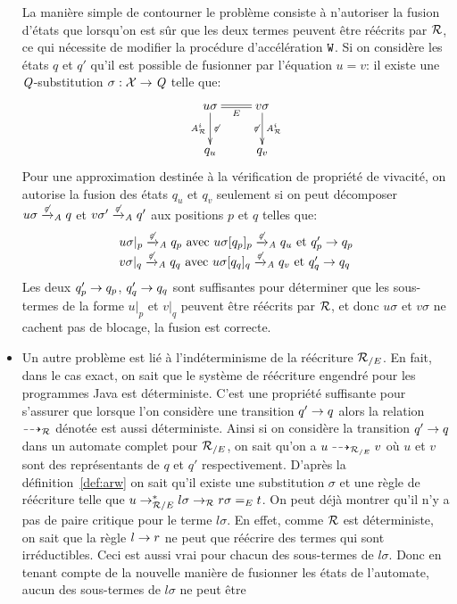 \begin{itemize}
  La manière simple de contourner le problème consiste à n'autoriser la fusion d'états que lorsqu'on est
  sûr que les deux termes peuvent être réécrits par $\mathcal R$, ce qui nécessite de modifier la procédure d'accélération
  $\mathtt{W}$. Si on considère les états $q$ et $q'$ qu'il est possible
  de fusionner par l'équation $u = v$:
  il existe une $\mathit Q$-substitution $\sigma : \mathcal X \rightarrow\mathit Q$ telle que:
   \[\xymatrix{
     u\sigma \ar@{=}[r]_{E}\ar[d]_{\aaex^i}^{\not\varepsilon} & v\sigma \ar[d]_{\not\varepsilon}^{\aaex^i}\\
     q_u & q_v
   } \]
   Pour une approximation destinée à la vérification de propriété de vivacité, on autorise la fusion
   des états $q_u$ et $q_v$ seulement si on peut décomposer
   $u\sigma \xrightarrow{\not\varepsilon}_\mathit A q$ et $v\sigma' \xrightarrow{\not\varepsilon}_\mathit A q'$ aux positions $p$ et $q$ telles que:
   \[\begin{array}{l}
     u\sigma|_p \xrightarrow{\not\varepsilon}_\mathit A q_p \textrm{ avec } u\sigma[q_p]_p \xrightarrow{\not\varepsilon}_\mathit A q_u \textrm{ et } q'_p \rightarrow q_p\\ 
     v\sigma|_q \xrightarrow{\not\varepsilon}_\mathit A q_q \textrm{ avec } u\sigma[q_q]_q \xrightarrow{\not\varepsilon}_\mathit A q_v \textrm{ et } q'_q \rightarrow q_q
   \end{array}\]
   Les deux $q'_p \rightarrow q_p$, $q'_q \rightarrow q_q$ sont suffisantes pour déterminer que les sous-termes de la forme $u|_p$
   et $v|_q$ peuvent être réécrits par $\mathcal R$, et donc $u\sigma$ et $v\sigma$ ne cachent pas de blocage, la fusion
   est correcte.
 \item
   Un autre problème est lié à l'indéterminisme de la réécriture ${\mathcal R_{/E}}$. En fait, dans le cas
   exact, on sait que le système de réécriture engendré pour les programmes Java est déterministe.
   C'est une propriété suffisante pour s'assurer que lorsque l'on considère une transition $q' \rightarrow q$
   alors la relation $\dashrightarrow_{\mathcal R}$ dénotée est aussi déterministe.
   Ainsi si on considère la transition $q' \rightarrow q$ dans un automate complet pour ${\mathcal R_{/E}}$, on sait
   qu'on a $u \dashrightarrow_{\mathcal R_{/E}} v$ où $u$ et $v$ sont des représentants de $q$ et $q'$ respectivement.
   D'après la définition~\ref{def:arw} on sait qu'il existe une substitution $\sigma$ et une règle
   de réécriture telle que $u \rightarrow_{\mathcal R/E}^* l\sigma \rightarrow_\mathcal R r\sigma =_E t$. On peut déjà montrer
   qu'il n'y a pas de paire critique pour le terme $l\sigma$. En effet, comme $\mathcal R$ est déterministe,
   on sait que la règle $l\rightarrow r$ ne peut que réécrire des termes qui sont irréductibles.
   Ceci est aussi vrai pour chacun des sous-termes de $l\sigma$. Donc en tenant compte de la nouvelle
   manière de fusionner les états de l'automate, aucun des sous-termes de $l\sigma$ ne peut être

\end{itemize}
